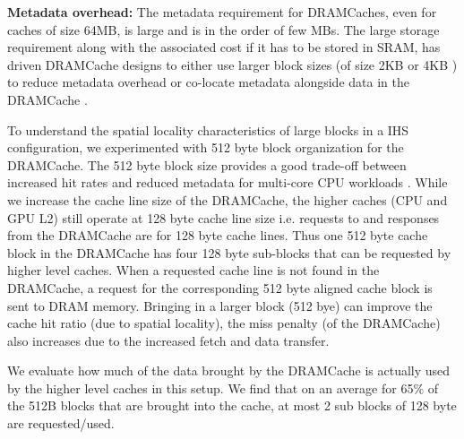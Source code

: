 \par \textbf{Metadata overhead:} The metadata requirement for DRAMCaches, even for caches of size 64MB, is large and is in the order of few MBs. The large storage requirement along with the associated cost if it has to be stored in SRAM, has driven DRAMCache designs to either use larger block sizes (of size 2KB or 4KB \cite{footprint,unison-cache}) to reduce metadata overhead or co-locate metadata alongside data in the DRAMCache \cite{loh-hill,alloy,atcache}. 
\par To understand the spatial locality characteristics of large blocks in a IHS configuration, we experimented with 512 byte block organization for the DRAMCache. 
The 512 byte block size provides a good trade-off between increased hit rates and reduced metadata for multi-core CPU workloads \cite{bimodal}. While we increase the cache line size of the DRAMCache, the higher caches (CPU and GPU L2) still operate at 128 byte cache line size i.e. requests to and responses from the DRAMCache are for 128 byte cache lines. Thus one 512 byte cache block in the DRAMCache has four 128 byte sub-blocks that can be requested by higher level caches. When a requested cache line is not found in the DRAMCache, a request for the corresponding 512 byte aligned cache block is sent to DRAM memory. Bringing in a larger block (512 bye) can improve the cache hit ratio (due to spatial locality), the miss penalty (of the DRAMCache) also increases due to the increased fetch and data transfer. 
\par We evaluate how much of the data brought by the DRAMCache is actually used by the higher level caches in this setup. We find that on an average for 65\% of the 512B blocks that are brought into the cache, at most 2 sub blocks of 128 byte are requested/used.
